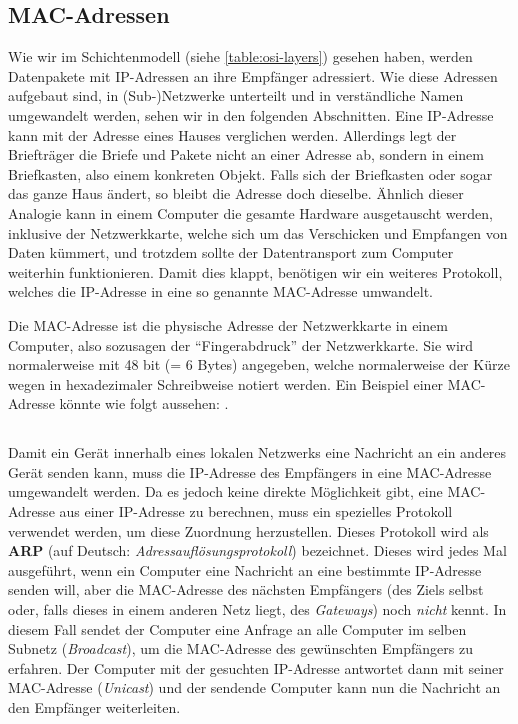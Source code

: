 \subsection{MAC-Adressen}
Wie wir im Schichtenmodell (siehe \cref{table:osi-layers}) gesehen haben, werden Datenpakete mit \gls{IP}-Adressen an ihre Empfänger adressiert. Wie diese Adressen aufgebaut sind, in (Sub-)Netzwerke unterteilt und in verständliche Namen umgewandelt werden, sehen wir in den folgenden Abschnitten. Eine \gls{IP}-Adresse kann mit der Adresse eines Hauses verglichen werden. Allerdings legt der Briefträger die Briefe und Pakete nicht an einer Adresse ab, sondern in einem Briefkasten, also einem konkreten Objekt. Falls sich der Briefkasten oder sogar das ganze Haus ändert, so bleibt die Adresse doch dieselbe. Ähnlich dieser Analogie kann in einem Computer die gesamte Hardware ausgetauscht werden, inklusive der Netzwerkkarte, welche sich um das Verschicken und Empfangen von Daten kümmert, und trotzdem sollte der Datentransport zum Computer weiterhin funktionieren. Damit dies klappt, benötigen wir ein weiteres Protokoll, welches die \gls{IP}-Adresse in eine so genannte \gls{MAC}-Adresse umwandelt.

\begin{mydefinition}
Die \gls{MAC}-Adresse ist die physische Adresse der Netzwerkkarte in einem Computer, also sozusagen der \enquote{Fingerabdruck} der Netzwerkkarte. Sie wird normalerweise mit 48 bit (= 6 Bytes) angegeben, welche normalerweise der Kürze wegen in hexadezimaler Schreibweise notiert werden. Ein Beispiel einer \gls{MAC}-Adresse könnte wie folgt aussehen: .
\end{mydefinition}

\subsection{\texorpdfstring{}{ARP}}
Damit ein Gerät innerhalb eines lokalen Netzwerks eine Nachricht an ein anderes Gerät senden kann, muss die \gls{IP}-Adresse des Empfängers in eine \gls{MAC}-Adresse umgewandelt werden. Da es jedoch keine direkte Möglichkeit gibt, eine \gls{MAC}-Adresse aus einer \gls{IP}-Adresse zu berechnen, muss ein spezielles Protokoll verwendet werden, um diese Zuordnung herzustellen. Dieses Protokoll wird als \textbf{\gls{ARP}} (auf Deutsch: \textit{Adressauflösungsprotokoll}) bezeichnet. Dieses wird jedes Mal ausgeführt, wenn ein Computer eine Nachricht an eine bestimmte \gls{IP}-Adresse senden will, aber die \gls{MAC}-Adresse des nächsten Empfängers (des Ziels selbst oder, falls dieses in einem anderen Netz liegt, des \textit{Gateways}) noch \textit{nicht} kennt. In diesem Fall sendet der Computer eine Anfrage an alle Computer im selben Subnetz (\textit{Broadcast}), um die \gls{MAC}-Adresse des gewünschten Empfängers zu erfahren. Der Computer mit der gesuchten \gls{IP}-Adresse antwortet dann mit seiner \gls{MAC}-Adresse (\textit{Unicast}) und der sendende Computer kann nun die Nachricht an den Empfänger weiterleiten.

